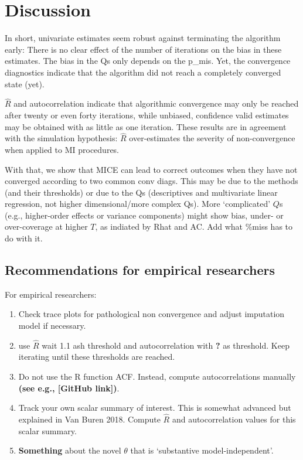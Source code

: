 \documentclass[Royal,times,sageh]{sagej}
\begin{document}
\hypertarget{discussion}{%
\section{Discussion}\label{discussion}}

In short, univariate estimates seem robust against terminating the
algorithm early: There is no clear effect of the number of iterations on
the bias in these estimates. The bias in the Qs only depends on the
p\_mis. Yet, the convergence diagnostics indicate that the algorithm did
not reach a completely converged state (yet).

\(\widehat{R}\) and autocorrelation indicate that algorithmic
convergence may only be reached after twenty or even forty iterations,
while unbiased, confidence valid estimates may be obtained with as
little as one iteration. These results are in agreement with the
simulation hypothesis: \(\widehat{R}\) over-estimates the severity of
non-convergence when applied to MI procedures.

With that, we show that MICE can lead to correct outcomes when they have
not converged according to two common conv diags. This may be due to the
methods (and their thresholds) or due to the Qs (descriptives and
multivariate linear regression, not higher dimensional/more complex Qs).
More `complicated' \(Q\)s (e.g., higher-order effects or variance
components) might show bias, under- or over-coverage at higher \(T\), as
indiated by Rhat and AC. Add what \%miss has to do with it.

\hypertarget{recommendations-for-empirical-researchers}{%
\subsection{Recommendations for empirical
researchers}\label{recommendations-for-empirical-researchers}}

For empirical researchers:

\begin{enumerate}
\def\labelenumi{\arabic{enumi}.}
\item
  Check trace plots for pathological non convergence and adjust
  imputation model if necessary.
\item
  use \(\widehat{R}\) wait 1.1 ash threshold and autocorrelation with
  \textbf{?} as threshold. Keep iterating until these thresholds are
  reached.
\item
  Do not use the R function ACF. Instead, compute autocorrelations
  manually \textbf{(see e.g., {[}GitHub link{]})}.
\item
  Track your own scalar summary of interest. This is somewhat advanced
  but explained in Van Buren 2018. Compute \(\widehat{R}\) and
  autocorrelation values for this scalar summary.
\item
  \textbf{Something} about the novel \(\theta\) that is `substantive
  model-independent'.
\end{enumerate}
\end{document}
